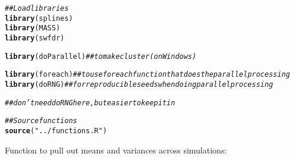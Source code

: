 \documentclass{article}\usepackage[]{graphicx}\usepackage[]{color}
\makeatletter
\newcommand{\hlstr}[1]{\textcolor[rgb]{0.192,0.494,0.8}{#1}}%
\newcommand{\hlcom}[1]{\textcolor[rgb]{0.678,0.584,0.686}{\textit{#1}}}%
\newcommand{\hlstd}[1]{\textcolor[rgb]{0.345,0.345,0.345}{#1}}%
\newcommand{\hlkwd}[1]{\textcolor[rgb]{0.737,0.353,0.396}{\textbf{#1}}}%
\newenvironment{kframe}{%
 \def\at@end@of@kframe{}%
 \ifinner\ifhmode%
  \def\at@end@of@kframe{\end{minipage}}%
  \begin{minipage}{\columnwidth}%
 \fi\fi%
 \def\FrameCommand##1{\hskip\@totalleftmargin \hskip-\fboxsep
 \colorbox{shadecolor}{##1}\hskip-\fboxsep
     \hskip-\linewidth \hskip-\@totalleftmargin \hskip\columnwidth}%
 \MakeFramed {\advance\hsize-\width
   \@totalleftmargin\z@ \linewidth\hsize
   \@setminipage}}%
 {\par\unskip\endMakeFramed%
 \at@end@of@kframe}
\newenvironment{knitrout}{}{} %
\makeatother
\begin{document}
\begin{knitrout}
\color{fgcolor}\begin{kframe}
\begin{alltt}
\hlcom{## Load libraries}
\hlkwd{library}\hlstd{(splines)}
\hlkwd{library}\hlstd{(MASS)}
\hlkwd{library}\hlstd{(swfdr)}

\hlkwd{library}\hlstd{(doParallel)} \hlcom{##to make cluster (on Windows)}
\end{alltt}


{\ttfamily\noindent\itshape\color{messagecolor}{\#\# Loading required package: foreach}}

{\ttfamily\noindent\itshape\color{messagecolor}{\#\# Loading required package: iterators}}

{\ttfamily\noindent\itshape\color{messagecolor}{\#\# Loading required package: parallel}}\begin{alltt}
\hlkwd{library}\hlstd{(foreach)} \hlcom{##to use foreach function that does the parallel processing}
\hlkwd{library}\hlstd{(doRNG)} \hlcom{##for reproducible seeds when doing parallel processing}
\end{alltt}


{\ttfamily\noindent\itshape\color{messagecolor}{\#\# Loading required package: rngtools}}

{\ttfamily\noindent\itshape\color{messagecolor}{\#\# Loading required package: pkgmaker}}

{\ttfamily\noindent\itshape\color{messagecolor}{\#\# Loading required package: registry}}

{\ttfamily\noindent\itshape\color{messagecolor}{\#\# \\\#\# Attaching package: 'pkgmaker'}}

{\ttfamily\noindent\itshape\color{messagecolor}{\#\# The following object is masked from 'package:base':\\\#\# \\\#\#\ \ \ \  isNamespaceLoaded}}\begin{alltt}
\hlcom{##don't need doRNG here, but easier to keep it in}

\hlcom{##Source functions}
\hlkwd{source}\hlstd{(}\hlstr{"../functions.R"}\hlstd{)}
\end{alltt}
\end{kframe}
\end{knitrout}

Function to pull out means and variances across simulations:
\end{document}
